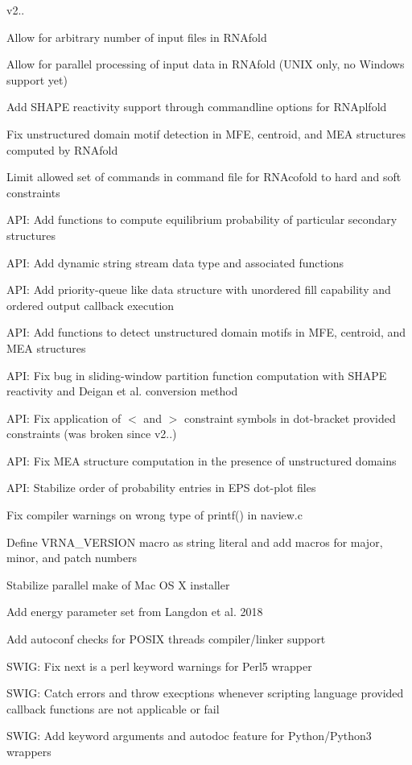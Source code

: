 v2..
\begin{DoxyItemize}
\item Allow for arbitrary number of input files in R\+N\+Afold
\item Allow for parallel processing of input data in R\+N\+Afold (U\+N\+IX only, no Windows support yet)
\item Add S\+H\+A\+PE reactivity support through commandline options for R\+N\+Aplfold
\item Fix unstructured domain motif detection in M\+FE, centroid, and M\+EA structures computed by R\+N\+Afold
\item Limit allowed set of commands in command file for R\+N\+Acofold to hard and soft constraints
\item A\+PI\+: Add functions to compute equilibrium probability of particular secondary structures
\item A\+PI\+: Add dynamic string stream data type and associated functions
\item A\+PI\+: Add priority-\/queue like data structure with unordered fill capability and ordered output callback execution
\item A\+PI\+: Add functions to detect unstructured domain motifs in M\+FE, centroid, and M\+EA structures
\item A\+PI\+: Fix bug in sliding-\/window partition function computation with S\+H\+A\+PE reactivity and Deigan et al. conversion method
\item A\+PI\+: Fix application of \textquotesingle{}$<$\textquotesingle{} and \textquotesingle{}$>$\textquotesingle{} constraint symbols in dot-\/bracket provided constraints (was broken since v2..)
\item A\+PI\+: Fix M\+EA structure computation in the presence of unstructured domains
\item A\+PI\+: Stabilize order of probability entries in E\+PS dot-\/plot files
\item Fix compiler warnings on wrong type of printf() in naview.\+c
\item Define V\+R\+N\+A\+\_\+\+V\+E\+R\+S\+I\+ON macro as string literal and add macros for major, minor, and patch numbers
\item Stabilize parallel make of Mac OS X installer
\item Add energy parameter set from Langdon et al. 2018
\item Add autoconf checks for P\+O\+S\+IX threads compiler/linker support
\item S\+W\+IG\+: Fix \textquotesingle{}next\textquotesingle{} is a perl keyword warnings for Perl5 wrapper
\item S\+W\+IG\+: Catch errors and throw execptions whenever scripting language provided callback functions are not applicable or fail
\item S\+W\+IG\+: Add keyword arguments and autodoc feature for Python/\+Python3 wrappers
\end{DoxyItemize}

